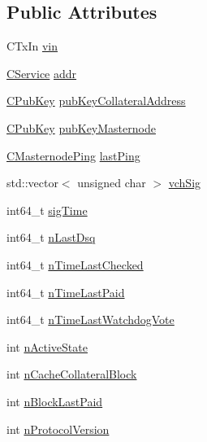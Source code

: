 \subsection*{Public Attributes}
\begin{DoxyCompactItemize}
\item 
C\+Tx\+In \mbox{\hyperlink{class_c_masternode_a485b26778bb8b006152aaa64168afe6b}{vin}}
\item 
\mbox{\hyperlink{class_c_service}{C\+Service}} \mbox{\hyperlink{class_c_masternode_a259ea116c54b904cf238a3e9c0cf1e0b}{addr}}
\item 
\mbox{\hyperlink{class_c_pub_key}{C\+Pub\+Key}} \mbox{\hyperlink{class_c_masternode_ada049bf0e9f9e43b7ac1fd3e9af27a0d}{pub\+Key\+Collateral\+Address}}
\item 
\mbox{\hyperlink{class_c_pub_key}{C\+Pub\+Key}} \mbox{\hyperlink{class_c_masternode_a6120b4345c618f7a252a44f4dd828708}{pub\+Key\+Masternode}}
\item 
\mbox{\hyperlink{class_c_masternode_ping}{C\+Masternode\+Ping}} \mbox{\hyperlink{class_c_masternode_a114a0ba01b5dfa4d785380007edd31f3}{last\+Ping}}
\item 
std\+::vector$<$ unsigned char $>$ \mbox{\hyperlink{class_c_masternode_a880d00984546ced35c26924d5d80dedc}{vch\+Sig}}
\item 
int64\+\_\+t \mbox{\hyperlink{class_c_masternode_a89fca1a40dbccbe67b173d76fac399ea}{sig\+Time}}
\item 
int64\+\_\+t \mbox{\hyperlink{class_c_masternode_ab9d3bfad4bfc61f9113b3adbc792bbe2}{n\+Last\+Dsq}}
\item 
int64\+\_\+t \mbox{\hyperlink{class_c_masternode_ae4e7095e01c08c1c50150dc62fedc7af}{n\+Time\+Last\+Checked}}
\item 
int64\+\_\+t \mbox{\hyperlink{class_c_masternode_ab1e04527f86d9a12c5a1157829bca828}{n\+Time\+Last\+Paid}}
\item 
int64\+\_\+t \mbox{\hyperlink{class_c_masternode_adf082caa4d554ca270692b47014ba6bb}{n\+Time\+Last\+Watchdog\+Vote}}
\item 
int \mbox{\hyperlink{class_c_masternode_a41efbc881997e3df19dcf0e430c76d82}{n\+Active\+State}}
\item 
int \mbox{\hyperlink{class_c_masternode_a00ec475167455ad481db6c459d7fb96c}{n\+Cache\+Collateral\+Block}}
\item 
int \mbox{\hyperlink{class_c_masternode_a469895ce53fb69d5ec5218fa8ce93dad}{n\+Block\+Last\+Paid}}
\item 
int \mbox{\hyperlink{class_c_masternode_a03c6c954bc7391668c89434cf6c87fa3}{n\+Protocol\+Version}}

\end{DoxyCompactItemize}
